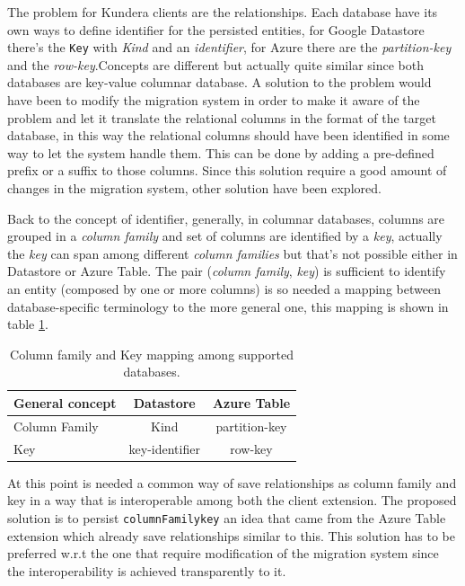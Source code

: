 \noindent The problem for Kundera clients are the relationships. Each database have its own ways to define identifier for the persisted entities, for Google Datastore there's the \texttt{Key} with \textit{Kind} and an \textit{identifier}, for Azure there are the \textit{partition-key} and the \textit{row-key}.Concepts are different but actually quite similar since both databases are key-value columnar database. 
A solution to the problem would have been to modify the migration system in order to make it aware of the problem and let it translate the relational columns in the format of the target database, in this way the relational columns should have been identified in some way to let the system handle them. This can be done by adding a pre-defined prefix or a suffix to those columns.
Since this solution require a good amount of changes in the migration system, other solution have been explored.
 
\newparagraph Back to the concept of identifier, generally, in columnar databases, columns are grouped in a \textit{column family} and set of columns are identified by a \textit{key}, actually the \textit{key} can span among different \textit{column families} but that's not possible either in Datastore or Azure Table.
The pair (\textit{column family}, \textit{key}) is sufficient to identify an entity (composed by one or more columns) is so needed a mapping between database-specific terminology to the more general one, this mapping is shown in table \ref{table:mapping}.

\begin{table}[h]
\begin{center}
\renewcommand{\arraystretch}{1.4}
\begin{tabular}{lcc}
\hline
\textbf{General concept} & \textbf{Datastore} & \textbf{Azure Table}\\ 
\hline\hline
Column Family & Kind & partition-key \\
Key & key-identifier & row-key \\
\hline
\end{tabular}
\end{center}
\caption{Column family and Key mapping among supported databases.}
\label{table:mapping}
\end{table}

\noindent At this point is needed a common way of save relationships as column family and key in a way that is interoperable among both the client extension.
The proposed solution is to persist \texttt{columnFamily\textunderscore key} an idea that came from the Azure Table extension which already save relationships similar to this. This solution has to be preferred w.r.t the one that require modification of the migration system since the interoperability is achieved transparently to it.

